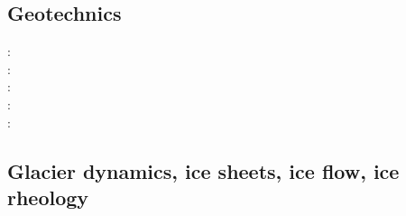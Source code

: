 \subsection{Geotechnics}

\begin{scriptsize}
\nineteenninetynine: \cite{ster99}\\
\twothousandthree: \cite{gora03}\cite{zhll03}\\
\twothousandfour: \cite{gour04}\\
\twothousandsix: \cite{gork06}\\
\twothousandfourteen: \cite{bufy14}
\end{scriptsize}

\subsection{Glacier dynamics, ice sheets, ice flow, ice rheology}

